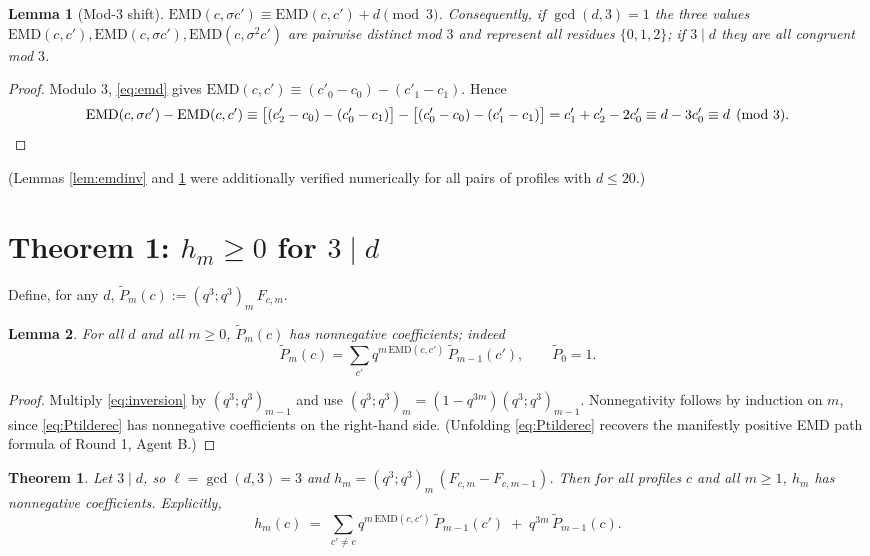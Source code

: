\documentclass[11pt]{article}
\newtheorem{theorem}{Theorem}
\newtheorem{lemma}{Lemma}
\newcommand{\EMD}{\mathrm{EMD}}
\begin{document}
\begin{lemma}[Mod-3 shift]\label{lem:mod3}
$\EMD(c,\sigma c') \equiv \EMD(c,c') + d \pmod 3$. Consequently, if $\gcd(d,3)=1$ the three
values $\EMD(c,c'), \EMD(c,\sigma c'), \EMD(c,\sigma^2 c')$ are pairwise distinct mod $3$
and represent all residues $\{0,1,2\}$; if $3\mid d$ they are all congruent mod $3$.
\end{lemma}

\begin{proof}
Modulo 3, \eqref{eq:emd} gives $\EMD(c,c') \equiv (c'_0-c_0)-(c'_1-c_1)$. Hence
\[
\EMD(c,\sigma c') - \EMD(c,c') \equiv \bigl[(c'_2-c_0)-(c'_0-c_1)\bigr]
- \bigl[(c'_0-c_0)-(c'_1-c_1)\bigr]
= c'_1+c'_2-2c'_0 \equiv d - 3c'_0 \equiv d \pmod 3. \qedhere
\]
\end{proof}

(Lemmas \ref{lem:emdinv} and \ref{lem:mod3} were additionally verified numerically for all
pairs of profiles with $d\le 20$.)

\section{Theorem 1: $h_m \ge 0$ for $3 \mid d$}

Define, for any $d$, $\widetilde P_m(c) := (q^3;q^3)_m\, F_{c,m}$.

\begin{lemma}\label{lem:Ptilde}
For all $d$ and all $m \ge 0$, $\widetilde P_m(c)$ has nonnegative coefficients; indeed
\begin{equation}\label{eq:Ptilderec}
\widetilde P_m(c) = \sum_{c'} q^{m\,\EMD(c,c')}\, \widetilde P_{m-1}(c'), \qquad \widetilde P_0 = 1 .
\end{equation}
\end{lemma}

\begin{proof}
Multiply \eqref{eq:inversion} by $(q^3;q^3)_{m-1}$ and use
$(q^3;q^3)_m = (1-q^{3m})(q^3;q^3)_{m-1}$. Nonnegativity follows by induction on $m$,
since \eqref{eq:Ptilderec} has nonnegative coefficients on the right-hand side.
(Unfolding \eqref{eq:Ptilderec} recovers the manifestly positive EMD path formula of
Round 1, Agent B.)
\end{proof}

\begin{theorem}\label{thm:div3}
Let $3\mid d$, so $\ell=\gcd(d,3)=3$ and $h_m = (q^3;q^3)_m\,(F_{c,m}-F_{c,m-1})$. Then for
all profiles $c$ and all $m\ge 1$, $h_m$ has nonnegative coefficients. Explicitly,
\begin{equation}\label{eq:hdiv3}
h_m(c) \;=\; \sum_{c'\ne c} q^{m\,\EMD(c,c')}\, \widetilde P_{m-1}(c') \;+\; q^{3m}\, \widetilde P_{m-1}(c).
\end{equation}
\end{theorem}
\end{document}
